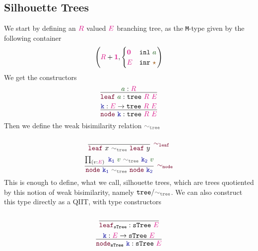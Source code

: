 \documentclass[twoside,11pt,openright]{report}
\theoremstyle{plain} %
\theoremstyle{definition}
\theoremstyle{remark}
\newcommand*{\term}[1]{\textcolor{green!30!black}{#1}} %
\newcommand*{\type}[1]{\textcolor{magenta!90!black}{#1}}
\newcommand*{\unit}{\type{\textbf{1}}}
\newcommand*{\empt}{\type{\textbf{0}}}
\newcommand*{\relation}[1]{\textcolor{gray!75!black}{\ensuremath{\mathtt{#1}}}}
\newcommand*{\constant}[1]{\textcolor{orange!60!black}{\ensuremath{\mathtt{#1}}}}
\newcommand*{\function}[1]{\textcolor{blue!60!black}{\ensuremath{\mathtt{#1}}}}
\newcommand*{\constructor}[1]{\textcolor{purple!60!black}{\ensuremath{\mathtt{#1}}}}
\newcommand*{\typeformer}[1]{\ensuremath{\mathtt{#1}}}
\newcommand*{\unitelem}{\constant{\star}} %
\begin{document}
\subsection{Silhouette Trees}
We start by defining an \(\type{R}\) valued \(\type{E}\) branching tree, as the \texttt{M}-type given by the following container
\begin{equation}
  \left(\type{R} + \unit , \begin{cases} \empt & \mathtt{inl}~\term{a} \\ \type{E} & \mathtt{inr}~\unitelem \end{cases}\right)
\end{equation}
We get the constructors
\begin{equation}
  \vcenter{\infer{\constructor{leaf}~\term{a} : \typeformer{tree}~\type{R}~\type{E}}{\term{a} : \type{R}}}
\end{equation}
\begin{equation}
  \vcenter{\infer{\constructor{node}~\function{k} : \typeformer{tree}~\type{R}~\type{E}}{\function{k} : \type{E} \rightarrow \typeformer{tree}~\type{R}~\type{E}}}
\end{equation}
Then we define the weak bisimilarity relation \(\relation{\sim_{tree}}\)
\begin{equation}
  \vcenter{\infer[\constructor{\sim_{leaf}}]{\constructor{leaf}~x~\relation{\sim_{tree}}~\constructor{leaf}~y}{\strut}}
\end{equation}
\begin{equation}
  \vcenter{\infer[\constructor{\sim_{node}}]{\constructor{node}~\function{k_1}~\relation{\sim_{tree}}~\constructor{node}~\function{k_2}}{\prod_{(v : \type{E})}~\function{k_1}~\term{v}~\relation{\sim_{tree}}~\function{k_2}~\term{v}}}
\end{equation}
This is enough to define, what we call, silhouette trees, which are trees quotiented by this notion of weak bisimilarity, namely \(\typeformer{tree} / \relation{\sim_{tree}}\). We can also construct this type directly as a QIIT, with type constructors 
\begin{equation}
  \vcenter{\infer{\constructor{leaf}_{\typeformer{sTree}} : \typeformer{sTree}~\type{E}}{\strut}}
\end{equation}
\begin{equation}
  \vcenter{\infer{\constructor{node}_{\typeformer{sTree}}~\function{k} : \typeformer{sTree}~\type{E}}{\function{k} : \type{E} \rightarrow \typeformer{sTree}~\type{E}}}
\end{equation}
\end{document}
